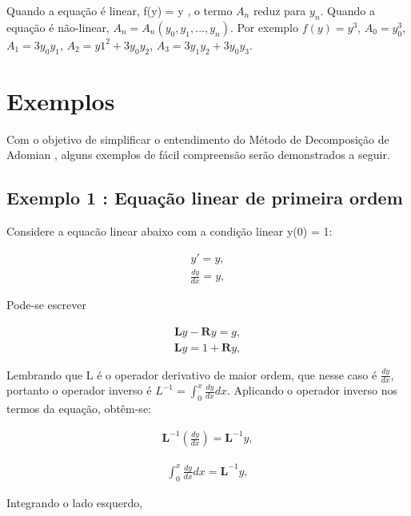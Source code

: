   Quando a equação é linear, f(y) = y , o termo $A_{n}$ reduz para $y_{n}$. Quando a equação é não-linear, $A_{n} = A_{n} (y_{0}, y_{1},...,y_{n})$. Por exemplo $f(y) = y^3$, $A_{0} = y_{0}^3$, $A_{1} = 3y_{0}y_{1}$, $A_{2} = y1^2+3y_{0}y_{2}$, $A_{3} = 3y_{1}y_{2} + 3y_{0}y_{3}$.

 
 
 \section{Exemplos}
 
 Com o objetivo de simplificar o entendimento do Método de Decomposição de Adomian , alguns exemplos de fácil compreensão serão demonstrados a seguir.
 
 \subsection{Exemplo 1 : Equação linear de primeira ordem}
 
 Considere a equacão linear abaixo com a condição linear y(0) = 1:
 
 \begin{gather*}
 y' = y, 
  \end{gather*}
   \begin{gather*}
 \frac{d y}{d x} = y,
 \end{gather*}

Pode-se escrever

\begin{gather*}
 \textbf{L}y - \textbf{R}y = g,
  \end{gather*}
  \begin{gather*}
 \textbf{L}y = 1 + \textbf{R}y ,
  \end{gather*}
  
  Lembrando que L é o operador derivativo de maior ordem, que nesse caso é $\frac{d y}{d x}$, portanto o operador inverso é $L^{-1}=\int_0^{x}\frac{d y}{d x} dx$. Aplicando o operador inverso nos termos da equação, obtêm-se:

\begin{gather*}
 \textbf{L}^{-1}\left(\frac{d y}{d x}\right) = \textbf{L}^{-1} y,
  \end{gather*}
  
  \begin{gather*}
  \int_0^{x}\frac{d y}{d x}dx = \textbf{L}^{-1} y,
\end{gather*} 

Integrando o lado esquerdo,

